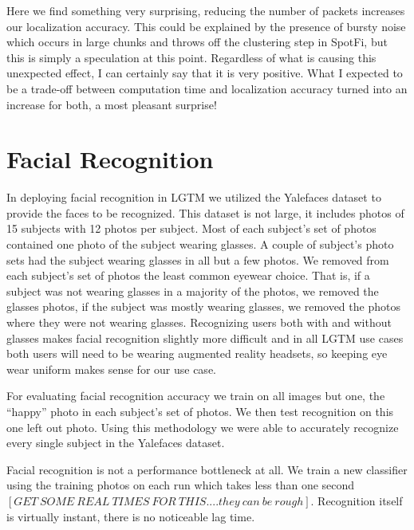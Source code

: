 \documentclass[12pt]{report}
\begin{document}
Here we find something very surprising, reducing the number of packets increases our localization accuracy. This could be explained by the presence of bursty noise which occurs in large chunks and throws off the clustering step in SpotFi, but this is simply a speculation at this point. Regardless of what is causing this unexpected effect, I can certainly say that it is very positive. What I expected to be a trade-off between computation time and localization accuracy turned into an increase for both, a most pleasant surprise! \par

\section{Facial Recognition}
In deploying facial recognition in LGTM we utilized the Yalefaces \cite{FisherfacesBelhumeur1997} dataset to provide the faces to be recognized. This dataset is not large, it includes photos of 15 subjects with 12 photos per subject. Most of each subject's set of photos contained one photo of the subject wearing glasses. A couple of subject's photo sets had the subject wearing glasses in all but a few photos. We removed from each subject's set of photos the least common eyewear choice. That is, if a subject was not wearing glasses in a majority of the photos, we removed the glasses photos, if the subject was mostly wearing glasses, we removed the photos where they were not wearing glasses. Recognizing users both with and without glasses makes facial recognition slightly more difficult and in all LGTM use cases both users will need to be wearing augmented reality headsets, so keeping eye wear uniform makes sense for our use case. \par

For evaluating facial recognition accuracy we train on all images but one, the ``happy'' photo in each subject's set of photos. We then test recognition on this one left out photo. Using this methodology we were able to accurately recognize every single subject in the Yalefaces dataset. \par

Facial recognition is not a performance bottleneck at all. We train a new classifier using the training photos on each run which takes less than one second $[GET \: SOME \: REAL \: TIMES \: FOR \: THIS....they \: can \: be \: rough]$. Recognition itself is virtually instant, there is no noticeable lag time. \par
\end{document}
